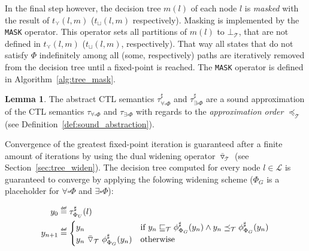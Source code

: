 \documentclass[11pt,a4paper,titlepage]{article}
\theoremstyle{definition}
\newtheorem{lemma}[theorem]{Lemma}
\newcommand\eqdef{\mathrel{\overset{\makebox[0pt]{\mbox{\normalfont\tiny\sffamily def}}}{=}}}
\begin{document}
In the final step however, the decision tree $m(l)$ of each node $l$ is \textit{masked} with the result of $t_{\curlyvee}(l,m)$ ($t_{\sqcup}(l,m)$ respectively).
Masking is implemented by the \texttt{MASK} operator. This operator sets all partitions of $m(l)$ to $\bot_\mathcal{T}$,
that are not defined in $t_{\curlyvee}(l,m)$ ($t_{\sqcup}(l,m)$, respectively).
That way all states that do not satisfy $\Phi$ indefinitely among all (some, respectively) paths are iteratively 
removed from the decision tree until a fixed-point is reached. 
The \texttt{MASK} operator is defined in Algorithm~\ref{alg:tree_mask}.


\begin{lemma}
    The abstract CTL semantics 
    $\tau^{\sharp}_{\forall\square\Phi}$ and $\tau^{\sharp}_{\exists\square\Phi}$
    are a sound approximation of the CTL semantics
    $\tau_{\forall\square\Phi}$ and $\tau_{\exists\square\Phi}$
    with regards to the \textit{approximation order} $\preceq_\mathcal{T}$ (see Definition~\ref{def:sound_abstraction}).\\
\end{lemma}

Convergence of the greatest fixed-point iteration is guaranteed after a finite amount of iterations by using the dual 
widening operator $\bar\triangledown_\mathcal{T}$  (see Section~\ref{sec:tree_widen}). 
The decision tree computed for every node $l \in \mathcal{L}$ is guaranteed to converge by applying the folowing widening scheme 
($\Phi_G$ is a placeholder for $\forall\square\Phi$ and $\exists\square\Phi$):

\begin{align*}
    y_0 &\eqdef \tau^\sharp_{\Phi_U}(l)\\
    y_{n+1} &\eqdef 
    \begin{cases}
        y_n                   &\text{if} \ y_n \sqsubseteq_\mathcal{T} \phi^\sharp_{\Phi_{G}}(y_n)  
        \land y_n \preceq_\mathcal{T} \phi^\sharp_{\Phi_G}(y_n)  \\
        y_n \ \bar\triangledown_\mathcal{T} \ \phi^\sharp_{\Phi_G}(y_n)     &\text{otherwise}
    \end{cases}
\end{align*}
\end{document}
